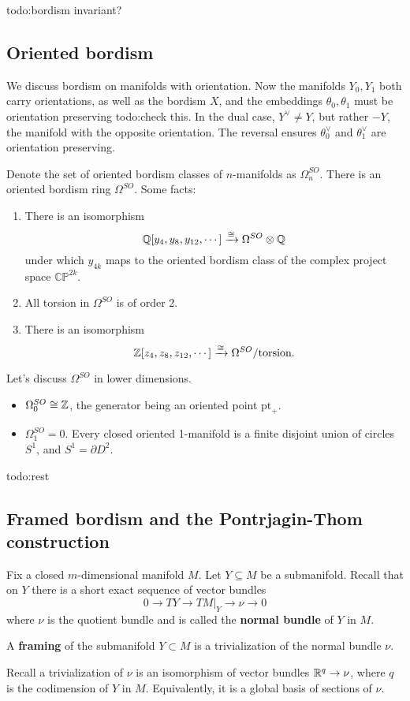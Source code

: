   {\color{red}todo:bordism invariant?}  

  \subsection{Oriented bordism}
  We discuss bordism on manifolds with orientation. Now the manifolds $Y_0,Y_1$ both carry orientations, as well as the bordism $X$, and the embeddings $\theta_0,\theta_1$ must be orientation preserving {\color{red}todo:check this}. In the dual case, $Y^{\vee}\neq Y$, but rather $-Y$, the manifold with the opposite orientation. The reversal ensures $\theta_0 ^{\vee}$ and $\theta_1^{\vee}$ are orientation preserving.

  Denote the set of oriented bordism classes of $n$-manifolds as $\Omega_n ^{SO}$. There is an oriented bordism ring $\Omega^{SO}$. Some facts:
  \begin{theorem}
      \begin{enumerate}[label=(\roman*)]
      \setlength\itemsep{-.2em}
          \item There is an isomorphism \[
                  \mathbb{Q}[y_4,y_8,y _{12},\cdots ] \xrightarrow{\cong} \Omega^{SO}\otimes \mathbb{Q}
          \] under which $y_{4k}$ maps to the oriented bordism class of the complex project space $\mathbb {CP} ^{2k}$.
      \item All torsion in $\Omega^{SO}$ is of order 2.
        \item There is an isomorphism \[
                \mathbb{Z}[z_4,z_8, z_{12},\cdots ] \xrightarrow{\cong} \Omega^{SO} / \text{torsion} .
        \] 
      \end{enumerate}
  \end{theorem}
  Let's discuss $\Omega ^{SO}$ in lower dimensions.
  \begin{itemize}
  \setlength\itemsep{-.2em}
      \item $\Omega_0^{SO}\cong \mathbb{Z}$, the generator being an oriented point $\text{pt} _+$.
      \item $\Omega_1^{SO}=0$. Every closed oriented 1-manifold is a finite disjoint union of circles $S^1 $, and $S^1 =\partial  D^2$.
  \end{itemize} 
  {\color{red}todo:rest} 
  \subsection{Framed bordism and the Pontrjagin-Thom construction}
  Fix a closed $m$-dimensional manifold $M$. Let $Y \subseteq M$ be a submanifold. Recall that on $Y$ there is a short exact sequence of vector bundles \[
      0 \to  TY \to \left. TM \right| _Y \to \nu \to 0
  \] where $\nu$ is the quotient bundle and is called the \textbf{normal bundle} of $Y$ in $M$.
  \begin{definition}[]
      A \textbf{framing} of the submanifold $Y \subset M$ is a trivialization of the normal bundle $\nu$.
  \end{definition}Recall a trivialization of $\nu$ is an isomorphism of vector bundles $\mathbb{R}^q \to \nu$, where $q$ is the codimension of $Y$ in $M$. Equivalently, it is a global basis of sections of $\nu$.

